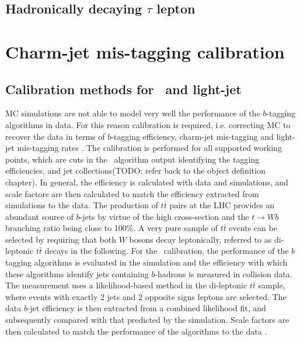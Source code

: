 \documentclass[letterpaper,12pt]{article}
\begin{document}
\subsection{Hadronically decaying $\tau$ lepton}


\section{Charm-jet mis-tagging calibration}

\subsection{Calibration methods for \bjet\ and light-jet}

MC simulations are not able to model very well the 
performance of the $b$-tagging algorithms in data. For this reason 
calibration is required, i.e. correcting MC to recover the data 
in terms of $b$-tagging efficiency, charm-jet mis-tagging and 
light-jet mis-tagging rates \cite{FTAG-2018-01}. The calibration is performed 
for all supported working points, which are cuts in the \btagging\ 
algorithm output identifying the tagging efficiencies, and jet 
collections(TODO: refer back to the object definition chapter). 
In general, the efficiency is calculated with data and simulations, 
and scale factors are then calculated to match the efficiency extracted 
from simulations to the data.
The production of $t\bar{t}$ 
pairs at the LHC provides an abundant source of $b$-jets by virtue 
of the high cross-section and the $t \rightarrow Wb$ branching ratio 
being close to 100\%. A very pure sample of $t\bar{t}$ events can be 
selected by requiring that both $W$ bosons decay leptonically, 
referred to as di-leptonic $t\bar{t}$ decays in the following.
For the \bjet\ calibration, the performance of the $b$ tagging 
algorithms is evaluated in the simulation and the efficiency 
with which these algorithms identify jets containing $b$-hadrons 
is measured in collision data. The measurement uses a likelihood-based 
method in the di-leptonic $t\bar{t}$ sample, where
events with exactly 2 jets and 2 opposite signs leptons are selected.  
The data $b$-jet efficiency is 
then extracted from a combined likelihood fit, and subsequently 
compared with that predicted by the simulation. Scale factors are 
then calculated to match the performance of the algorithms to the data \cite{FTAG-2018-01}.
\end{document}
